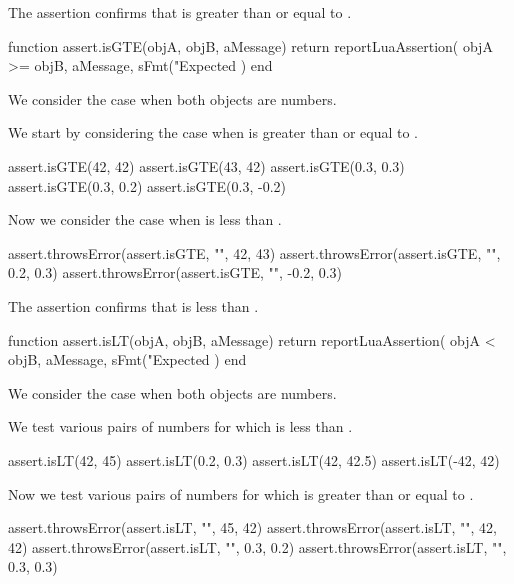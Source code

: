 \stopTestSuite


The  assertion confirms that  is greater 
than or equal to . 

\startLuaCode
function assert.isGTE(objA, objB, aMessage)
  return reportLuaAssertion(
    objA >= objB,
    aMessage,
    sFmt("Expected %
  )
end
\stopLuaCode


We consider the case when both objects are numbers.

We start by considering the case when  is greater than or equal 
to . 

\startLuaTest
  assert.isGTE(42, 42)
  assert.isGTE(43, 42)
  assert.isGTE(0.3, 0.3)
  assert.isGTE(0.3, 0.2)
  assert.isGTE(0.3, -0.2)
\stopLuaTest

Now we consider the case when  is less than . 

\startLuaTest
  assert.throwsError(assert.isGTE, "", 42, 43)
  assert.throwsError(assert.isGTE, "", 0.2, 0.3)
  assert.throwsError(assert.isGTE, "", -0.2, 0.3)
\stopLuaTest
\stopTestCase

\stopTestSuite


The  assertion confirms that  is less than 
. 

\startLuaCode
function assert.isLT(objA, objB, aMessage)
  return reportLuaAssertion(
    objA < objB,
    aMessage,
    sFmt("Expected %
  )
end
\stopLuaCode


We consider the case when both objects are numbers.

We test various pairs of numbers for which  is less than 
. 

\startLuaTest
  assert.isLT(42, 45)
  assert.isLT(0.2, 0.3)
  assert.isLT(42, 42.5)
  assert.isLT(-42, 42)
\stopLuaTest

Now we test various pairs of numbers for which  is greater than 
or equal to . 

\startLuaTest
  assert.throwsError(assert.isLT, "", 45, 42)
  assert.throwsError(assert.isLT, "", 42, 42)
  assert.throwsError(assert.isLT, "", 0.3, 0.2)
  assert.throwsError(assert.isLT, "", 0.3, 0.3)
\stopLuaTest
\stopTestCase

